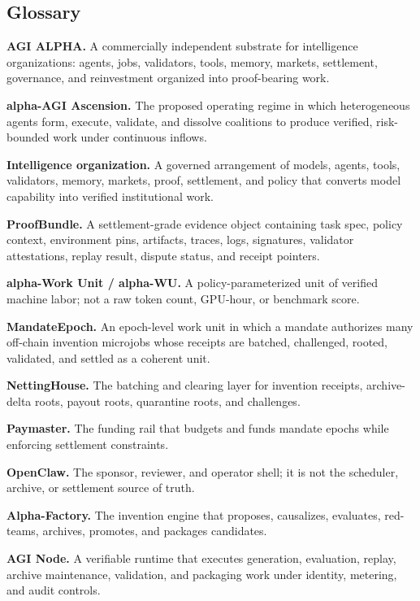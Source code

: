 \documentclass[
  11pt,
]{article}
\begin{document}
\subsection{Glossary}\label{glossary}

\textbf{AGI ALPHA.} A commercially independent substrate for
intelligence organizations: agents, jobs, validators, tools, memory,
markets, settlement, governance, and reinvestment organized into
proof-bearing work.

\textbf{alpha-AGI Ascension.} The proposed operating regime in which
heterogeneous agents form, execute, validate, and dissolve coalitions to
produce verified, risk-bounded work under continuous inflows.

\textbf{Intelligence organization.} A governed arrangement of models,
agents, tools, validators, memory, markets, proof, settlement, and
policy that converts model capability into verified institutional work.

\textbf{ProofBundle.} A settlement-grade evidence object containing task
spec, policy context, environment pins, artifacts, traces, logs,
signatures, validator attestations, replay result, dispute status, and
receipt pointers.

\textbf{alpha-Work Unit / alpha-WU.} A policy-parameterized unit of
verified machine labor; not a raw token count, GPU-hour, or benchmark
score.

\textbf{MandateEpoch.} An epoch-level work unit in which a mandate
authorizes many off-chain invention microjobs whose receipts are
batched, challenged, rooted, validated, and settled as a coherent unit.

\textbf{NettingHouse.} The batching and clearing layer for invention
receipts, archive-delta roots, payout roots, quarantine roots, and
challenges.

\textbf{Paymaster.} The funding rail that budgets and funds mandate
epochs while enforcing settlement constraints.

\textbf{OpenClaw.} The sponsor, reviewer, and operator shell; it is not
the scheduler, archive, or settlement source of truth.

\textbf{Alpha-Factory.} The invention engine that proposes, causalizes,
evaluates, red-teams, archives, promotes, and packages candidates.

\textbf{AGI Node.} A verifiable runtime that executes generation,
evaluation, replay, archive maintenance, validation, and packaging work
under identity, metering, and audit controls.
\end{document}
